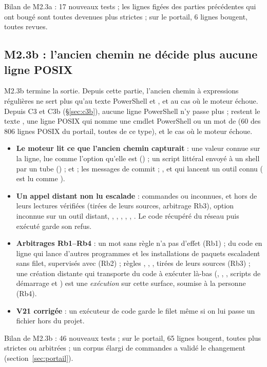 Bilan de M2.3a : 17 nouveaux tests ; les lignes figées des parties précédentes qui ont
bougé sont toutes devenues plus strictes ; sur le portail, 6 lignes bougent, toutes revues.

\subsection{M2.3b : l'ancien chemin ne décide plus aucune ligne POSIX}
M2.3b termine la sortie. Depuis cette partie, l'ancien chemin à expressions régulières ne sert
plus qu'au texte PowerShell et , et au cas où le moteur échoue. Depuis C3 et C3b
(§\ref{sec:c3b}), aucune ligne PowerShell n'y passe plus ; restent le texte , une
ligne POSIX qui nomme une cmdlet PowerShell ou un mot de  (60 des 806 lignes POSIX
du portail, toutes de ce type), et le cas où le moteur échoue.
\begin{itemize}
  \item \textbf{Le moteur lit ce que l'ancien chemin capturait} : une valeur connue sur la ligne,
    lue comme l'option qu'elle est () ; un script littéral envoyé à un
    shell par un tube () ;  et  ; les messages de commit ; ,  et  qui lancent
    un outil connu ( est lu comme ).
  \item \textbf{Un appel distant non lu escalade} : commandes  ou 
    inconnues,  et  hors de leurs lectures vérifiées (tirées de leurs
    sources, arbitrage Rb3), option inconnue sur un outil distant, ,
    , , , ,
    . Le code récupéré du réseau puis exécuté garde son refus.
  \item \textbf{Arbitrages Rb1--Rb4} : un mot sans règle n'a pas d'effet (Rb1) ; du code en ligne
    qui lance d'autres programmes et les installations de paquets escaladent sans filet,
    supervisés avec (Rb2) ; règles , , ,
     tirées de leurs sources (Rb3) ; une création distante qui transporte du code
    à exécuter là-bas (, , ,
    scripts de démarrage  et ) est une \emph{exécution} sur cette surface,
    soumise à la personne (Rb4).
  \item \textbf{V21 corrigée} : un exécuteur de code garde le filet même si on lui passe un
    fichier hors du projet.
\end{itemize}

Bilan de M2.3b : 46 nouveaux tests ; sur le portail, 65 lignes bougent, toutes plus strictes ou
arbitrées ; un corpus élargi de \nbcorpuslarge{} commandes a validé le changement
(section~\ref{sec:portail}).
